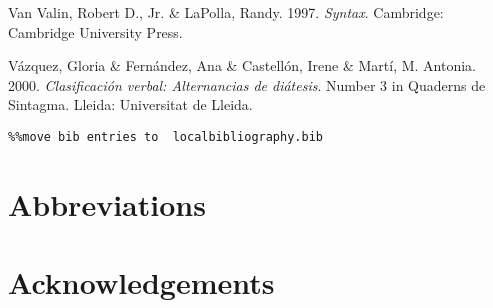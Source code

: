 \documentclass[output=paper]{langsci/langscibook}
\begin{document}
Van Valin, Robert D., Jr. \& LaPolla, Randy. 1997. \textit{Syntax}. Cambridge: Cambridge University Press.

Vázquez, Gloria \& Fernández, Ana \& Castellón, Irene \& Martí, M. Antonia. 2000. \textit{Clasificación verbal: Alternancias de diátesis}. Number 3 in Quaderns de Sintagma. Lleida: Universitat de Lleida.


\begin{verbatim}%%move bib entries to  localbibliography.bib
\end{verbatim}

\section*{Abbreviations}
\section*{Acknowledgements}

\printbibliography[heading=subbibliography,notkeyword=this]
\end{document}
